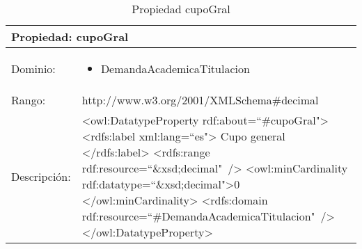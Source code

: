 \begin{table}[!ht]
	\centering
	\begin{tabular}{|p{}|p{}|}
		\hline
		\multicolumn{2}{|l|}{Propiedad: \textbf{cupoGral}}
		\\ \hline
		Dominio:&
		\begin{itemize}
			\item DemandaAcademicaTitulacion
		\end{itemize}
		\\ \hline
		Rango:&
		http://www.w3.org/2001/XMLSchema\#decimal
		\\ \hline
		Descripción:&
		\textless owl:DatatypeProperty rdf:about=``\#cupoGral"\textgreater\newline 
		\tab\textless rdfs:label xml:lang=``es"\textgreater\newline
		\tab\tab Cupo general\newline
		\tab\textless /rdfs:label\textgreater\newline
		\tab\textless rdfs:range\newline
		\tab\tab rdf:resource=``\&xsd;decimal"\ /\textgreater\newline
		\tab\textless owl:minCardinality \newline
		\tab\tab rdf:datatype=``\&xsd;decimal"\textgreater0\newline
		\tab\textless /owl:minCardinality\textgreater\newline
		\tab\textless rdfs:domain\newline
		\tab\tab rdf:resource=``\#DemandaAcademicaTitulacion"\ /\textgreater\newline
		\textless /owl:DatatypeProperty\textgreater
		\\ \hline
	\end{tabular}
	\caption{Propiedad cupoGral}
	\label{propiedad-cupogral}
\end{table}

